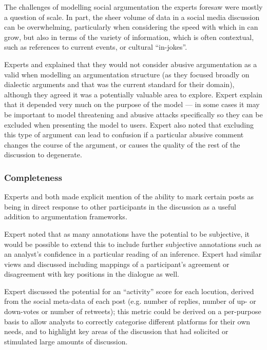 The challenges of modelling social argumentation the experts foresaw were mostly a question of scale. In part, the sheer volume of data in a social media discussion can be overwhelming, particularly when considering the speed with which in can grow, but also in terms of the variety of information, which is often contextual, such as references to current events, or cultural ``in-jokes''.

Experts \simon and \lizzy explained that they would not consider abusive argumentation as a valid when modelling an argumentation structure (as they focused broadly on dialectic arguments and that was the current standard for their domain), although they agreed it was a potentially valuable area to explore. Expert \jodi explain that it depended very much on the purpose of the model --- in some cases it may be important to model threatening and abusive attacks specifically so they can be excluded when presenting the model to users. Expert \ash also noted that excluding this type of argument can lead to confusion if a particular abusive comment changes the course of the argument, or causes the quality of the rest of the discussion to degenerate.

\subsubsection{Completeness}
Experts \simon and \jodi both made explicit mention of the ability to mark certain posts as being in direct response to other participants in the discussion as a useful addition to argumentation frameworks. 

Expert \jodi noted that as many annotations have the potential to be subjective, it would be possible to extend this to include further subjective annotations such as an analyst's confidence in a particular reading of an inference. Expert \bob had similar views and discussed including mappings of a participant's agreement or disagreement with key positions in the dialogue as well.

Expert \chris discussed the potential for an ``activity'' score for each locution, derived from the social meta-data of each post (e.g. number of replies, number of up- or down-votes or number of retweets); this metric could be derived on a per-purpose basis to allow analysts to correctly categorise different platforms for their own needs, and to highlight key areas of the discussion that had solicited or stimulated large amounts of discussion.

